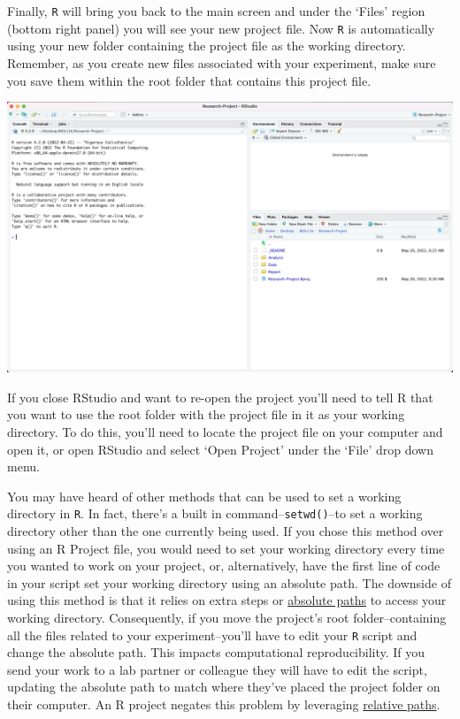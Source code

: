 \documentclass[
]{book}
\begin{document}
Finally, \texttt{R} will bring you back to the main screen and under the `Files' region (bottom right panel) you will see your new project file. Now \texttt{R} is automatically using your new folder containing the project file as the working directory. Remember, as you create new files associated with your experiment, make sure you save them within the root folder that contains this project file.

\includegraphics{images/D_new-project-old-folder-5.png}

If you close RStudio and want to re-open the project you'll need to tell R that you want to use the root folder with the project file in it as your working directory. To do this, you'll need to locate the project file on your computer and open it, or open RStudio and select `Open Project' under the `File' drop down menu.

You may have heard of other methods that can be used to set a working directory in \texttt{R}. In fact, there's a built in command--\texttt{setwd()}--to set a working directory other than the one currently being used. If you chose this method over using an R Project file, you would need to set your working directory every time you wanted to work on your project, or, alternatively, have the first line of code in your script set your working directory using an absolute path. The downside of using this method is that it relies on extra steps or \href{https://ubco-biology.github.io/Procedures-and-Guidelines/relative-and-absolute-paths}{absolute paths} to access your working directory. Consequently, if you move the project's root folder--containing all the files related to your experiment--you'll have to edit your \texttt{R} script and change the absolute path. This impacts computational reproducibility. If you send your work to a lab partner or colleague they will have to edit the script, updating the absolute path to match where they've placed the project folder on their computer. An R project negates this problem by leveraging \href{https://ubco-biology.github.io/Procedures-and-Guidelines/relative-and-absolute-paths}{relative paths}.
\end{document}
